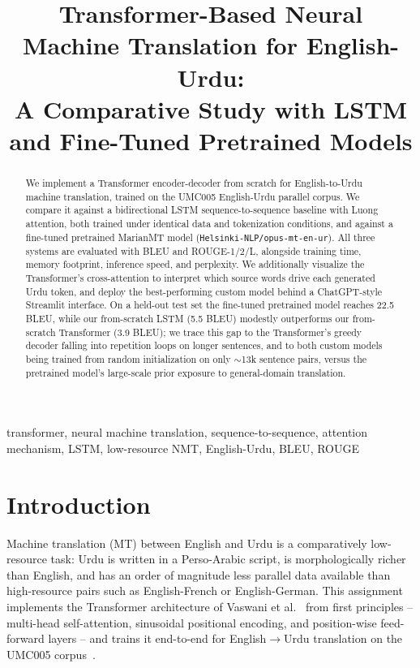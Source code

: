 \documentclass[conference]{IEEEtran}
\begin{document}
\title{Transformer-Based Neural Machine Translation for English-Urdu:\\
A Comparative Study with LSTM and Fine-Tuned Pretrained Models}

\author{
}

\maketitle

\begin{abstract}
We implement a Transformer encoder-decoder from scratch for English-to-Urdu
machine translation, trained on the UMC005 English-Urdu parallel corpus.
We compare it against a bidirectional LSTM sequence-to-sequence baseline
with Luong attention, both trained under identical data and tokenization
conditions, and against a fine-tuned pretrained MarianMT model
(\texttt{Helsinki-NLP/opus-mt-en-ur}). All three systems are evaluated with
BLEU and ROUGE-1/2/L, alongside training time, memory footprint, inference
speed, and perplexity. We additionally visualize the Transformer's
cross-attention to interpret which source words drive each generated Urdu
token, and deploy the best-performing custom model behind a ChatGPT-style
Streamlit interface. On a held-out test set the fine-tuned pretrained model
reaches 22.5 BLEU, while our from-scratch LSTM (5.5 BLEU) modestly
outperforms our from-scratch Transformer (3.9 BLEU); we trace this gap to
the Transformer's greedy decoder falling into repetition loops on longer
sentences, and to both custom models being trained from random
initialization on only $\sim$13k sentence pairs, versus the pretrained
model's large-scale prior exposure to general-domain translation.
\end{abstract}

\begin{IEEEkeywords}
transformer, neural machine translation, sequence-to-sequence, attention mechanism, LSTM, low-resource NMT, English-Urdu, BLEU, ROUGE
\end{IEEEkeywords}

\section{Introduction}
Machine translation (MT) between English and Urdu is a comparatively
low-resource task: Urdu is written in a Perso-Arabic script, is
morphologically richer than English, and has an order of magnitude less
parallel data available than high-resource pairs such as English-French or
English-German. This assignment implements the Transformer architecture of
Vaswani et al.~\cite{vaswani2017attention} from first principles --
multi-head self-attention, sinusoidal positional encoding, and
position-wise feed-forward layers -- and trains it end-to-end for
English$\rightarrow$Urdu translation on the UMC005 corpus~\cite{umc005}.
\end{document}
